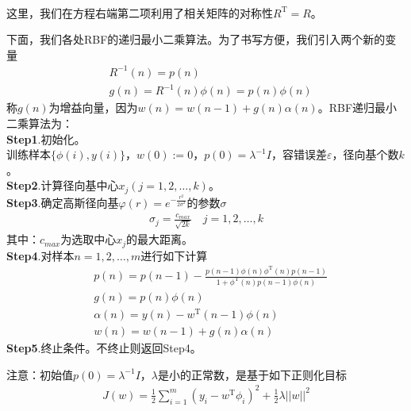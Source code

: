 {\begin{align*}
            \end{align*}
            这里，我们在方程右端第二项利用了相关矩阵的对称性$R^\mathrm{T} = R$。
            \par
            下面，我们各处RBF的递归最小二乘算法。为了书写方便，我们引入两个新的变量
            \begin{align*}
            & R^{-1}(n) = p(n)\\
            & g(n) = R^{-1}(n)\phi(n)= p(n)\phi(n)
            \end{align*}
            称$g(n)$为增益向量，因为$w(n) = w(n-1)+g(n)\alpha(n)$。RBF递归最小二乘算法为：\\
            \textbf{Step1}.初始化。\\
            训练样本$\{\phi(i),y(i)\}$，$w(0) := 0$，$p(0) = \lambda ^{-1}I$，容错误差$\varepsilon$，径向基个数$k$。\\
            \textbf{Step2}.计算径向基中心$x_j(j = 1,2,\dots,k)$。\\
            \textbf{Step3}.确定高斯径向基$\varphi(r) = e^{-\frac{r^2}{2\sigma^2}}$的参数$\sigma$
            \begin{align*}
            \sigma_j = \frac{c_{max}}{\sqrt{2k}} \quad j= 1,2,\dots,k
            \end{align*}
            其中：$c_{max}$为选取中心$x_j$的最大距离。\\
            \textbf{Step4}.对样本$n = 1,2,\dots,m$进行如下计算
            \begin{align*}
            & p(n) = p(n-1) - \frac{p(n-1)\phi(n)\phi^\mathrm{T}(n)p(n-1)}{1+\phi^\mathrm{T}(n)p(n-1)\phi(n)}\\
            & g(n) = p(n)\phi(n)\\
            & \alpha(n) = y(n) - w^\mathrm{T}(n-1)\phi(n)\\
            & w(n) = w(n-1)+g(n)\alpha(n)
            \end{align*}
            \textbf{Step5}.终止条件。不终止则返回Step4。
            \par
            注意：初始值$p(0) = \lambda^{-1} I$，$\lambda$是小的正常数，是基于如下正则化目标
            \begin{align}
            \label{RBF正则化目标}
            J(w) = \frac{1}{2} \sum_{i=1}^m \left( y_i - w^\mathrm{T}\phi_i \right) ^2 + \frac{1}{2}\lambda ||w||^2
            \end{align}
}
